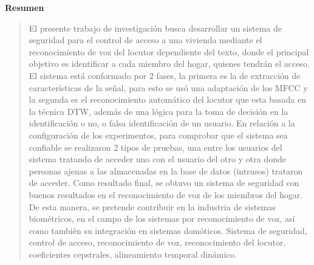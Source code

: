 %

%


\newpage
\begin{center}
 {\bf\LARGE Resumen}
\end{center} 
\begin{quotation}
El presente trabajo de investigación busca desarrollar un sistema de seguridad para el control de acceso a una vivienda mediante el reconocimiento de voz del locutor dependiente del texto, donde el principal objetivo es identificar a cada miembro del hogar, quienes tendrán el acceso.
\vskip 0.1cm
El sistema está conformado por 2 fases, la primera es la de extracción de características de la señal, para esto se usó una adaptación de los MFCC y la segunda es el reconocimiento automático del locutor que esta basada en la técnica DTW, además de una lógica para la toma de decisión en la identificación o no, o falsa identificación de un usuario. En relación a la configuración de los experimentos, para comprobar que el sistema sea confiable se realizaron 2 tipos de pruebas, una entre los usuarios del sistema tratando de acceder uno con el usuario del otro y otra donde personas ajenas a las almacenadas en la base de datos (intrusos) trataron de acceder.
\vskip 0.1cm
Como resultado final, se obtuvo un sistema de seguridad con buenos resultados en el reconocimiento de voz de los miembros del hogar. De esta manera, se pretende contribuir en la industria de sistemas biométricos, en el campo de los sistemas por reconocimiento de voz, así como también su integración en sistemas domóticos.
\vskip 0.1cm
\hspace*{-0.6cm}{\bf Palabras claves:} Sistema de seguridad, control de acceso, reconocimiento de voz, reconocimiento del locutor, coeficientes cepstrales, alineamiento temporal dinámico.
\end{quotation}


